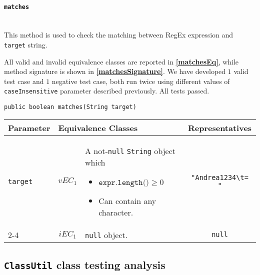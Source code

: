 \documentclass[sigconf]{acmart}
\begin{document}
\paragraph{\texttt{matches}}
\hfill\\
This method is used to check the matching between RegEx expression and \texttt{target} string.  

All valid and invalid equivalence classes are reported in \textbf{\cref{matchesEq}}, while method signature is shown in \textbf{\cref{matchesSignature}}. We have developed $1$ valid test case and $1$ negative test case, both run twice using different values of \texttt{caseInsensitive} parameter described previously. All tests passed.

\begin{lstlisting}[frame=lines,basicstyle=\ttfamily\tiny, caption={Signature of method \texttt{matches}}, label={matchesSignature}]
public boolean matches(String target)
\end{lstlisting}

\begin{table*}
\footnotesize
\caption{Equivalence classes and representatives of \texttt{matches} method}
\label{matchesEq}
\centering
\begin{tabular}{l|cm{10.5cm}|c}
\toprule
    \textbf{Parameter} & \multicolumn{2}{|l|}{\textbf{Equivalence Classes}} & \textbf{Representatives} \\
    \midrule
    
	\texttt{target} & $vEC_1$ & A not-\texttt{null} \texttt{String} object which
	\begin{itemize}
	\item  $\texttt{expr.length()} \geq 0$
	\item Can contain any character. 
\end{itemize}		
	& \texttt{"Andrea1234\textbackslash t= "}
    
    \\\cline{2-4}   
    
    & $iEC_1$ & \texttt{null} object. & \texttt{null} 
   
    
     \\  
    
    \bottomrule
  \end{tabular}
\end{table*}






\subsection{\texttt{ClassUtil} class testing analysis}
\end{document}
